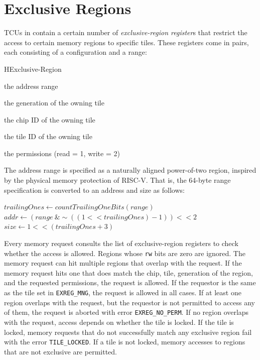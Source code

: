 \section{Exclusive Regions}

TCUs in contain a certain number of \emph{exclusive-region register}s that restrict the access to
certain memory regions to specific tiles. These registers come in pairs, each consisting of a
configuration and a range:

\begin{register}{H}{Exclusive-Region}{}
  \regnewline%
  \regnewline%
  \begin{regdesc}\begin{reglist}
    \item[range] the address range
    \item[gen] the generation of the owning tile
    \item[chip] the chip ID of the owning tile
    \item[tile] the tile ID of the owning tile
    \item[rw] the permissions (read = 1, write = 2)
  \end{reglist}\end{regdesc}
\end{register}

The address range is specified as a naturally aligned power-of-two region, inspired by the physical
memory protection of RISC-V. That is, the 64-byte range specification is converted to an address and
size as follows:

\begin{algorithm}[h]
    $trailingOnes \gets countTrailingOneBits(range)$\;
    $addr \gets (range\ \& \sim((1 << trailingOnes) - 1)) << 2$\;
    $size \gets 1 << (trailingOnes + 3)$\;
    \caption{Conversion of a range specification to address and size.}
\end{algorithm}

Every memory request consults the list of exclusive-region registers to check whether the access is
allowed. Regions whose \texttt{rw} bits are zero are ignored. The memory request can hit multiple
regions that overlap with the request. If the memory request hits one that does match the chip,
tile, generation of the region, and the requested permissions, the request is allowed. If the
requestor is the same as the tile set in \texttt{EXREG\_MNG}, the request is allowed in all cases.
If at least one region overlaps with the request, but the requestor is not permitted to access any
of them, the request is aborted with error \texttt{EXREG\_NO\_PERM}. If no region overlaps with the
request, access depends on whether the tile is locked. If the tile is locked, memory requests that
do not successfully match any exclusive region fail with the error \texttt{TILE\_LOCKED}. If a tile
is not locked, memory accesses to regions that are not exclusive are permitted.

